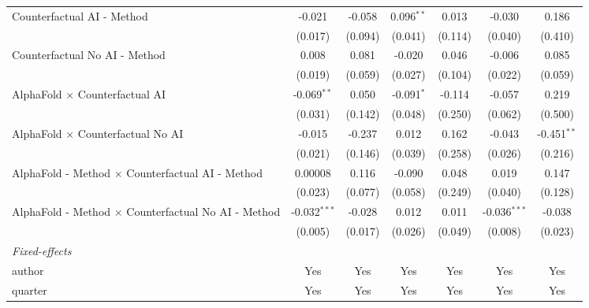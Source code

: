 \begin{tabular}{lcccccc}
   Counterfactual AI - Method                                 & -0.021         & -0.058       & 0.096$^{**}$ & 0.013   & -0.030         & 0.186\\   
                                                              & (0.017)        & (0.094)      & (0.041)      & (0.114) & (0.040)        & (0.410)\\   
   Counterfactual No AI - Method                              & 0.008          & 0.081        & -0.020       & 0.046   & -0.006         & 0.085\\   
                                                              & (0.019)        & (0.059)      & (0.027)      & (0.104) & (0.022)        & (0.059)\\   
   AlphaFold $\times$ Counterfactual AI                       & -0.069$^{**}$  & 0.050        & -0.091$^{*}$ & -0.114  & -0.057         & 0.219\\   
                                                              & (0.031)        & (0.142)      & (0.048)      & (0.250) & (0.062)        & (0.500)\\   
   AlphaFold $\times$ Counterfactual No AI                    & -0.015         & -0.237       & 0.012        & 0.162   & -0.043         & -0.451$^{**}$\\   
                                                              & (0.021)        & (0.146)      & (0.039)      & (0.258) & (0.026)        & (0.216)\\   
   AlphaFold - Method $\times$ Counterfactual AI - Method     & 0.00008        & 0.116        & -0.090       & 0.048   & 0.019          & 0.147\\   
                                                              & (0.023)        & (0.077)      & (0.058)      & (0.249) & (0.040)        & (0.128)\\   
   AlphaFold - Method $\times$ Counterfactual No AI - Method  & -0.032$^{***}$ & -0.028       & 0.012        & 0.011   & -0.036$^{***}$ & -0.038\\   
                                                              & (0.005)        & (0.017)      & (0.026)      & (0.049) & (0.008)        & (0.023)\\   
   \midrule
   \emph{Fixed-effects}\\
   author                                                     & Yes            & Yes          & Yes          & Yes     & Yes            & Yes\\  
   quarter                                                    & Yes            & Yes          & Yes          & Yes     & Yes            & Yes\\  

\end{tabular}

